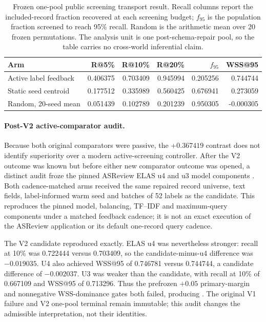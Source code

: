 \begin{table}[H]
\centering
\small
\begin{tabular}{lrrrrr}
\hline
Arm & R@5\% & R@10\% & R@20\% & $f_{95}$ & WSS@95 \\
\hline
Active label feedback & 0.406375 & 0.703409 & 0.945994 & 0.205256 & 0.744744 \\
Static seed centroid & 0.177512 & 0.335989 & 0.560425 & 0.676941 & 0.273059 \\
Random, 20-seed mean & 0.051439 & 0.102789 & 0.201239 & 0.950305 & -0.000305 \\
\hline
\end{tabular}
\caption{Frozen one-pool public screening transport result.  Recall columns
report the included-record fraction recovered at each screening budget;
$f_{95}$ is the population fraction screened to reach 95\% recall.  Random is
the arithmetic mean over 20 frozen permutations.  The analysis unit is one
post-schema-repair pool, so the table carries no cross-world inferential claim.}
\label{tab:p2-zenodo-transport}
\end{table}

\paragraph{Post-V2 active-comparator audit.}
Because both original comparators were passive, the $+0.367419$ contrast does
not identify superiority over a modern active-screening controller. After the
V2 outcome was known but before either new comparator outcome was opened, a
distinct audit froze the pinned ASReview ELAS u4 and u3 model components
\cite{vandeschoot2021asreview}. Both cadence-matched arms received the same
repaired record universe, text fields, label-informed warm seed and batches of
52 labels as the candidate. This reproduces the pinned model, balancing,
TF--IDF and maximum-query components under a matched feedback cadence; it is
not an exact execution of the ASReview application or its default one-record
query cadence.

The V2 candidate reproduced exactly. ELAS u4 was nevertheless stronger:
recall at 10\% was 0.722444 versus 0.703409, so the candidate-minus-u4
difference was $-0.019035$. U4 also achieved WSS@95 of 0.746781 versus
0.744744, a candidate difference of $-0.002037$. U3 was weaker than the
candidate, with recall at 10\% of 0.667109 and WSS@95 of 0.713296. Thus the
prefrozen $+0.05$ primary-margin and nonnegative WSS-dominance gates both
failed, producing
.
The original V1 failure and V2 one-pool terminal remain immutable; this audit
changes the admissible interpretation, not their identities.

